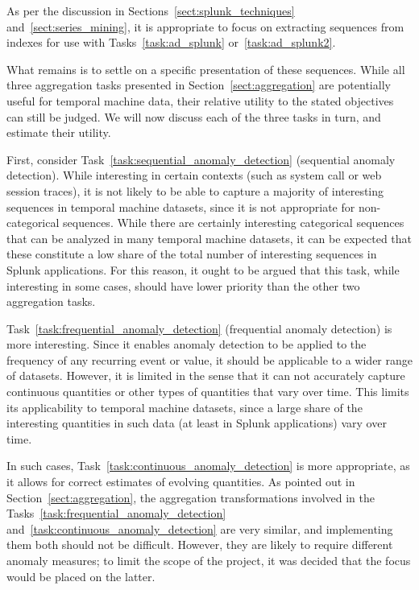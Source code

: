 As per the discussion in Sections~\ref{sect:splunk_techniques} and~\ref{sect:series_mining}, it is appropriate to focus on extracting sequences from indexes for use with Tasks~\ref{task:ad_splunk} or~\ref{task:ad_splunk2}.

What remains is to settle on a specific presentation of these sequences. While all three aggregation tasks presented in Section~\ref{sect:aggregation} are potentially useful for temporal machine data, their relative utility to the stated objectives can still be judged. We will now discuss each of the three tasks in turn, and estimate their utility.

First, consider Task~\ref{task:sequential_anomaly_detection} (sequential anomaly detection). While interesting in certain contexts (such as system call or web session traces), it is not likely to be able to capture a majority of interesting sequences in temporal machine datasets, since it is not appropriate for non-categorical sequences. While there are certainly interesting categorical sequences that can be analyzed in many temporal machine datasets, it can be expected that these constitute a low share of the total number of interesting sequences in Splunk applications. For this reason, it ought to be argued that this task, while interesting in some cases, should have lower priority than the other two aggregation tasks.

Task~\ref{task:frequential_anomaly_detection} (frequential anomaly detection) is more interesting. Since it enables anomaly detection to be applied to the frequency of any recurring event or value, it should be applicable to a wider range of datasets. However, it is limited in the sense that it can not accurately capture continuous quantities or other types of quantities that vary over time. This limits its applicability to temporal machine datasets, since a large share of the interesting quantities in such data (at least in Splunk applications) vary over time.

In such cases, Task~\ref{task:continuous_anomaly_detection} is more appropriate, as it allows for correct estimates of evolving quantities. As pointed out in Section~\ref{sect:aggregation}, the aggregation transformations involved in the Tasks~\ref{task:frequential_anomaly_detection} and~\ref{task:continuous_anomaly_detection} are very similar, and implementing them both should not be difficult. However, they are likely to require different anomaly measures; to limit the scope of the project, it was decided that the focus would be placed on the latter.

